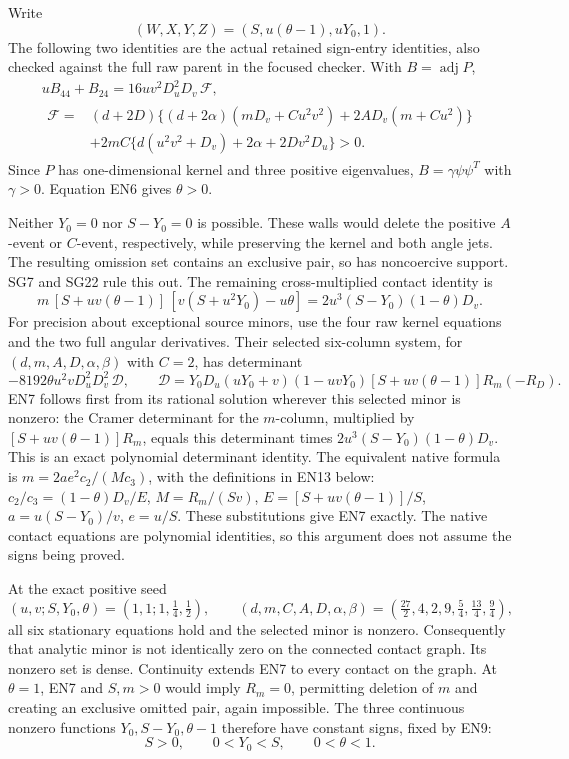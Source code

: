 Write
\[
 (W,X,Y,Z)=(S,u(\theta-1),uY_0,1).
 \tag{EN5}
\]
The following two identities are the actual retained sign-entry
identities, also checked against the full raw parent in the focused
checker.  With \(B=\operatorname{adj}P\),
\[
\begin{gathered}
 uB_{44}+B_{24}
 =16uv^2D_u^2D_v\,\mathcal F,\\
\begin{aligned}
 \mathcal F={}&(d+2D)\{(d+2\alpha)(mD_v+Cu^2v^2)
                       +2AD_v(m+Cu^2)\}\\
 &+2mC\{d(u^2v^2+D_v)+2\alpha+2Dv^2D_u\}>0 .
\end{aligned}
\end{gathered}\tag{EN6}
\]
Since \(P\) has one-dimensional kernel and three positive eigenvalues,
\(B=\gamma\psi\psi^T\) with \(\gamma>0\).  Equation EN6 gives
\(\theta>0\).

Neither \(Y_0=0\) nor \(S-Y_0=0\) is possible.  These walls would delete
the positive \(A\)-event or \(C\)-event, respectively, while preserving
the kernel and both angle jets.  The resulting omission set contains
an exclusive pair, so has noncoercive support.  SG7 and SG22 rule this out.
The remaining cross-multiplied contact identity is
\[
 m\,[S+uv(\theta-1)]\,
       [v(S+u^2Y_0)-u\theta]
   =2u^3(S-Y_0)(1-\theta)D_v .
 \tag{EN7}
\]
For precision about exceptional source minors, use the four raw kernel
equations and the two full angular derivatives.  Their selected six-column
system, for \((d,m,A,D,\alpha,\beta)\) with \(C=2\), has
determinant
\[
 -8192\theta u^2vD_u^2D_v^2\,\mathcal D,\qquad
 \mathcal D=Y_0D_u(uY_0+v)(1-uvY_0)
 [S+uv(\theta-1)]R_m(-R_D).
 \tag{EN8}
\]
EN7 follows first from its rational solution wherever this selected
minor is nonzero: the Cramer determinant for the \(m\)-column,
multiplied by \([S+uv(\theta-1)]R_m\), equals this determinant
times \(2u^3(S-Y_0)(1-\theta)D_v\).  This is an exact
polynomial determinant identity.  The equivalent native formula is
\(m=2ae^2c_2/(Mc_3)\), with the definitions in EN13 below:
\(c_2/c_3=(1-\theta)D_v/E\),
\(M=R_m/(Sv)\), \(E=[S+uv(\theta-1)]/S\),
\(a=u(S-Y_0)/v\), \(e=u/S\).  These substitutions give EN7
exactly.  The native contact equations are polynomial identities, so
this argument does not assume the signs being proved.

At the exact positive seed
\[
 (u,v;S,Y_0,\theta)=(1,1;1,\tfrac14,\tfrac12),\qquad
 (d,m,C,A,D,\alpha,\beta)
 =(\tfrac{27}2,4,2,9,\tfrac54,\tfrac{13}4,\tfrac94),
 \tag{EN9}
\]
all six stationary equations hold and the selected minor is nonzero.
Consequently that analytic minor is not identically zero on the
connected contact graph.  Its nonzero set is dense.  Continuity extends
EN7 to every contact on the graph.  At \(\theta=1\), EN7 and \(S,m>0\)
would imply \(R_m=0\), permitting deletion of \(m\) and creating an
exclusive omitted pair, again impossible.  The three continuous
nonzero functions \(Y_0,S-Y_0,\theta-1\) therefore have constant signs,
fixed by EN9:
\[
 S>0,\qquad 0<Y_0<S,\qquad 0<\theta<1.
 \tag{EN10}
\]

